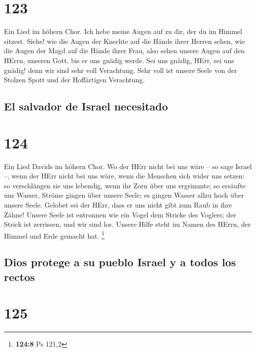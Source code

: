 \hypertarget{section-122}{%
\section{123}\label{section-122}}

 Ein Lied im höhern Chor. Ich hebe meine Augen auf zu dir,
der du im Himmel sitzest.  Siehe! wie die Augen der
Knechte auf die Hände ihrer Herren sehen, wie die Augen der Magd auf die
Hände ihrer Frau, also sehen unsere Augen auf den HErrn, unseren Gott,
bis er uns gnädig werde.  Sei uns gnädig, HErr, sei uns
gnädig! denn wir sind sehr voll Verachtung.  Sehr voll ist
unsere Seele von der Stolzen Spott und der Hoffärtigen Verachtung.

\hypertarget{el-salvador-de-israel-necesitado}{%
\subsection{El salvador de Israel
necesitado}\label{el-salvador-de-israel-necesitado}}

\hypertarget{section-123}{%
\section{124}\label{section-123}}

 Ein Lied Davids im höhern Chor. Wo der HErr nicht bei uns
wäre -- so sage Israel --,  wenn der HErr nicht bei uns
wäre, wenn die Menschen sich wider uns setzen:  so
verschlängen sie uns lebendig, wenn ihr Zorn über uns ergrimmte;
 so ersäufte uns Wasser, Ströme gingen über unsere Seele;
 es gingen Wasser allzu hoch über unsere Seele.
 Gelobet sei der HErr, dass er uns nicht gibt zum Raub in
ihre Zähne!  Unsere Seele ist entronnen wie ein Vogel dem
Stricke des Voglers; der Strick ist zerrissen, und wir sind los.
 Unsere Hilfe steht im Namen des HErrn, der Himmel und
Erde gemacht hat. \footnote{\textbf{124:8} Ps 121,2}

\hypertarget{dios-protege-a-su-pueblo-israel-y-a-todos-los-rectos}{%
\subsection{Dios protege a su pueblo Israel y a todos los
rectos}\label{dios-protege-a-su-pueblo-israel-y-a-todos-los-rectos}}

\hypertarget{section-124}{%
\section{125}\label{section-124}}

